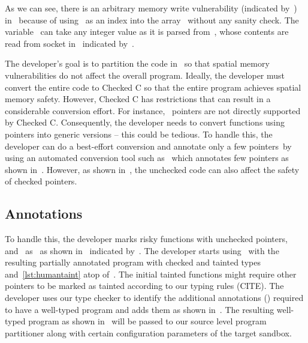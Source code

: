 As we can see, there is an arbitrary memory write vulnerability (indicated by~\realbug) in~ because of using~ as an index into the array~ without any sanity check.
The variable~ can take any integer value as it is parsed from~, whose contents are read from socket in~ indicated by~\rootcause.

The developer's goal is to partition the code in~ so that spatial memory vulnerabilities do not affect the overall program.
Ideally, the developer must convert the entire code to Checked C so that the entire program achieves spatial memory safety.
However, Checked C has restrictions that can result in a considerable conversion effort.
For instance,~ pointers are not directly supported by Checked C.
Consequently, the developer needs to convert functions using~ pointers into generic versions -- this could be tedious.
To handle this, the developer can do a best-effort conversion and annotate only a few pointers~\eg by using an automated conversion tool such as~\threec{} which annotates few pointers as shown in~.
However, as shown in~, the unchecked code can also affect the safety of checked pointers.
\subsection{\systemname Annotations}
\label{subsec:moveregionstosbx}
To handle this, the developer marks risky functions with unchecked pointers,~\ie~ and~ as~ as shown in~ indicated by~\useradded.
The developer starts using~\systemname{} with the resulting partially annotated program with checked and tainted types~\ie~ and~\ref{lst:humantaint} atop of~.
The initial tainted functions might require other pointers to be marked as tainted according to our typing rules (CITE).
The developer uses our type checker to identify the additional annotations (\usermods) required to have a well-typed program and adds them as shown in~.
The resulting well-typed program as shown in~ will be passed to our source level program partitioner along with certain configuration parameters of the target sandbox.

